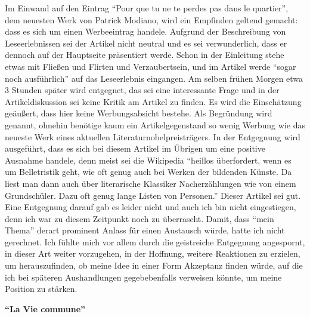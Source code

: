 \documentclass[fontsize=12pt]{scrartcl}
\begin{document}
Im Einwand auf den Eintrag "`Pour que tu ne te perdes pas dans le quartier"', dem neuesten Werk von Patrick Modiano, wird ein Empfinden geltend gemacht: dass es sich um einen Werbeeintrag handele. Aufgrund der Beschreibung von Leseerlebnissen sei der Artikel nicht neutral und es sei verwunderlich, dass er dennoch auf der Hauptseite pr\"asentiert werde. Schon in der Einleitung stehe etwas mit Flie{\ss}en und Flirten und Verzaubertsein, und im Artikel werde "`sogar noch ausf\"uhrlich"' auf das Leseerlebnis eingangen. Am selben fr\"uhen Morgen etwa 3 Stunden sp\"ater wird entgegnet, das sei eine interessante Frage und in der Artikeldis\-kus\-si\-on sei keine Kritik am Artikel zu finden. Es wird die Einsch\"atzung ge\"au{\ss}ert, dass \mbox{hier} keine Werbungsabsicht bestehe. Als Begr\"undung wird genannt, ohnehin ben\"otige kaum ein Artikelgegenstand so wenig Werbung wie das neueste Werk eines aktuellen Li\-te\-ra\-tur\-nobelpreistr\"agers. In der Entgegnung wird ausgef\"uhrt, dass es sich bei diesem Artikel im \"Ubrigen um eine positive Ausnahme handele, denn meist sei die Wi\-ki\-pe\-dia "`heillos \"uberfordert, wenn es um Belletristik geht, wie oft genug auch bei Werken der bildenden K\"unste. Da liest man dann auch \"uber li\-te\-ra\-rische Klassiker Nacherz\"ahlungen wie von einem Grundsch\"uler. Dazu oft genug lange Listen von Per\-so\-nen."' Dieser Artikel sei gut. Eine Entgegnung darauf gab es leider nicht und auch ich bin nicht eingestiegen, denn ich war zu diesem Zeitpunkt noch zu \"uberrascht. Damit, dass "`mein Thema"' derart prominent Anlass f\"ur einen Austausch w\"urde, hatte ich nicht gerechnet. Ich f\"uhlte mich vor allem durch die geistreiche Entgegnung angespornt, in dieser Art weiter vorzugehen, in der Hoffnung, weitere Reaktionen zu erzielen, um he\-rauszufinden, ob meine Idee in einer Form Akzeptanz finden w\"urde, auf die ich bei sp\"ateren Aushandlungen gegebebenfalls verweisen k\"onnte, um meine Position zu st\"arken.\newline

\textbf{"`La Vie commune"'}
\end{document}
